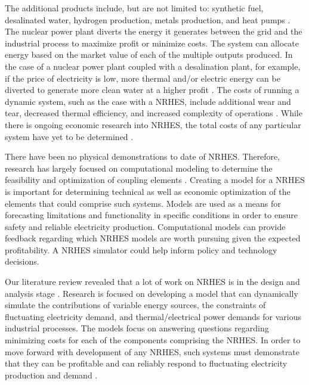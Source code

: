 \documentclass{article}                                                                           %
\begin{document}
\begin{linenumbers}
The additional products include, but are not limited to: synthetic fuel, desalinated water, hydrogen production, metals production, and heat pumps \cite{Bienvenue2015}. The nuclear power plant diverts the energy it generates between the grid and the industrial process to maximize profit or minimize costs. The system can allocate energy based on the market value of each of the multiple outputs produced. In the case of a nuclear power plant coupled with a desalination plant, for example, if the price of electricity is low, more thermal and/or electric energy can be diverted to generate more clean water at a higher profit \cite {Chen2016}. The costs of running a dynamic system, such as the case with a NRHES, include additional wear and tear, decreased thermal efficiency, and increased complexity of operations \cite{Garcia2013}. While there is ongoing economic research into NRHES, the total costs of any particular system have yet to be determined \cite{Rabiti2015}.

There have been no physical demonstrations to date of NRHES. Therefore, research has largely focused on computational modeling to determine the feasibility and optimization of coupling elements \cite{Boardman2013, Shropshire2012}. Creating a model for a NRHES is important for determining technical as well as economic optimization of the elements that could comprise such systems. Models are used as a means for forecasting limitations and functionality in specific conditions in order to ensure safety and reliable electricity production. Computational models can provide feedback regarding which NRHES models are worth pursuing given the expected profitability. A NRHES simulator could help inform policy and technology decisions.

Our literature review revealed that a lot of work on NRHES is in the design and analysis stage \cite{Boardman2013, Shropshire2012}. Research is focused on developing a model that can dynamically simulate the contributions of variable energy sources, the constraints of fluctuating electricity demand, and thermal/electrical power demands for various industrial processes. The models focus on answering questions regarding minimizing costs for each of the components comprising the NRHES. In order to move forward with development of any NRHES,  such systems must demonstrate that they can be profitable and can reliably respond to fluctuating electricity production and demand \cite{Rabiti2015}.


\end{linenumbers}
\end{document}
